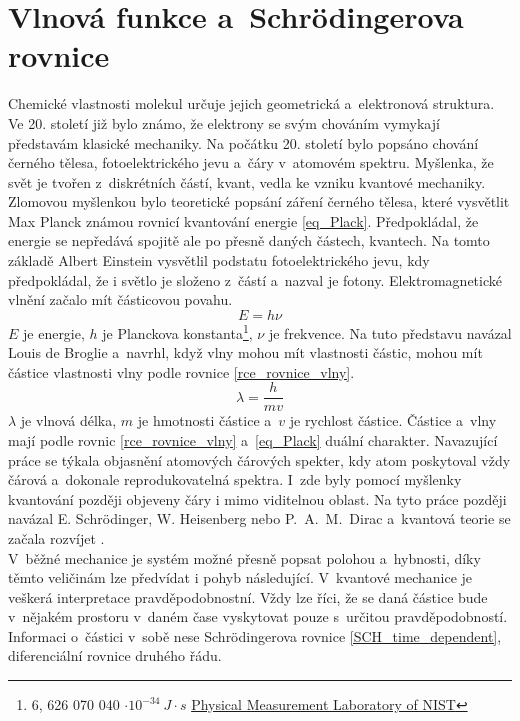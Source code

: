 \documentclass[
  printed, %
  table,   %
  lof,     %
  lot,     %
  oneside,
]{fithesis3}
\begin{document}
\section{Vlnová funkce a~Schrödingerova rovnice}
Chemické vlastnosti molekul určuje jejich geometrická a~elektronová struktura. Ve 20. století již bylo známo, že elektrony se svým chováním vymykají představám klasické mechaniky. Na počátku 20. století bylo popsáno chování černého tělesa, fotoelektrického jevu a~čáry v~atomovém spektru. Myšlenka, že svět je tvořen z~diskrétních částí, kvant, vedla ke vzniku kvantové mechaniky. Zlomovou myšlenkou bylo teoretické popsání záření černého tělesa, které vysvětlit Max Planck známou rovnicí kvantování energie \ref{eq_Plack}. Předpokládal, že energie se nepředává spojitě ale po přesně daných částech, kvantech. Na tomto základě Albert Einstein vysvětlil podstatu fotoelektrického jevu, kdy předpokládal, že i světlo je složeno z~částí a~nazval je fotony. Elektromagnetické vlnění začalo mít částicovou povahu.
\begin{equation}
E = h \nu
\label{eq_Plack}
\end{equation}
$E$ je energie, $h$  je Planckova konstanta\footnote{6, 626 070 040  $\cdot 10^{-34} ~ J \cdot s$ \href{http://physics.nist.gov/cgi-bin/cuu/Value?h}{ Physical Measurement Laboratory of NIST}  }, $\nu$ je frekvence. Na tuto představu navázal Louis de Broglie a~navrhl, když vlny mohou mít vlastnosti částic, mohou mít částice vlastnosti vlny podle rovnice \ref{rce_rovnice_vlny}.
\begin{equation}
\lambda = \frac{h}{mv}
\label{rce_rovnice_vlny}
\end{equation}
$\lambda$ je vlnová délka, $m$ je hmotnosti částice a~$v$ je rychlost částice. Částice a~vlny mají podle rovnic \ref{rce_rovnice_vlny} a~\ref{eq_Plack} duální charakter. Navazující práce se týkala objasnění atomových čárových spekter, kdy atom poskytoval vždy čárová a~dokonale reprodukovatelná spektra. I~zde byly pomocí myšlenky kvantování později objeveny čáry i mimo viditelnou oblast. Na tyto práce později navázal E. Schrödinger, W. Heisenberg nebo P.~A.~M.~Dirac a~kvantová teorie se začala rozvíjet \cite{celyprincipy}.\\
V~běžné mechanice je systém možné přesně popsat polohou a~hybnosti, díky těmto veličinám lze předvídat i pohyb následující. V~kvantové mechanice je veškerá interpretace pravděpodobnostní. Vždy lze říci, že se daná částice bude v~nějakém prostoru v~daném čase vyskytovat pouze s~určitou pravděpodobností. Informaci o~částici v~sobě nese Schrödingerova rovnice \ref{SCH_time_dependent}, diferenciální rovnice druhého řádu\cite{polak2000obecna}.
\end{document}
